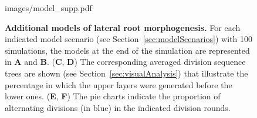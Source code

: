 \documentclass[11pt,a4paper, final]{article}
\newcommand{\TODO}[1]{
\textcolor{red}{TODO:#1}
}
\begin{document}
\begin{figure}[htbp]
\centering
	\begin{overpic}[width=1.0\linewidth]{images/model_supp.pdf}
	\end{overpic}
\caption[Additional models of lateral root morphogenesis.]
{{\bf Additional models of lateral root morphogenesis.} For each indicated model scenario (see Section~\ref{sec:modelScenarios}) with 100 simulations, the models at the end of the simulation are represented in \textbf{A} and \textbf{B}. (\textbf{C}, \textbf{D}) The corresponding averaged division sequence trees are shown (see Section~\ref{sec:visualAnalysis}) that illustrate the percentage in which the upper layers were generated before the lower ones. (\textbf{E}, \textbf{F}) The pie charts indicate the proportion of alternating divisions (in blue) in the indicated division rounds.
}
\label{fig:Modelsupp}
\end{figure}
%

%
%
\end{document}
